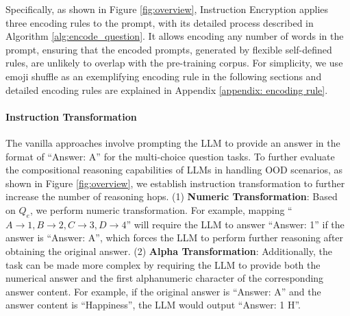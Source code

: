 Specifically, as shown in Figure \ref{fig:overview}, Instruction Encryption applies three encoding rules to the prompt, with its detailed process described in Algorithm \ref{alg:encode_question}.  
It allows encoding any number of words in the prompt, ensuring that the encoded prompts, generated by flexible self-defined rules, are unlikely to overlap with the pre-training corpus. For simplicity, we use emoji shuffle as an exemplifying encoding rule in the following sections and detailed encoding rules are explained in Appendix \ref{appendix: encoding rule}.
\nocite{langley00}
\paragraph{Instruction Transformation}

The vanilla approaches involve prompting the LLM to provide an answer in the format of ``Answer: A'' for the multi-choice question tasks. 
To further evaluate the compositional reasoning capabilities of LLMs in handling OOD scenarios, as shown in Figure \ref{fig:overview}, we establish instruction transformation to further increase the number of reasoning hops.
(1) \textbf{Numeric Transformation}: Based on $Q_{e}$, we perform numeric transformation. For example, mapping ``$A \rightarrow 1, B \rightarrow 2, C \rightarrow 3, D \rightarrow 4$'' will require the LLM to answer ``Answer: 1'' if the answer is ``Answer: A'', which forces the LLM to perform further reasoning after obtaining the original answer.
(2) \textbf{Alpha Transformation}: Additionally, the task can be made more complex by requiring the LLM to provide both the numerical answer and the first alphanumeric character of the corresponding answer content. For example, if the original answer is ``Answer: A'' and the answer content is ``Happiness'', the LLM would output ``Answer: 1 H''.

